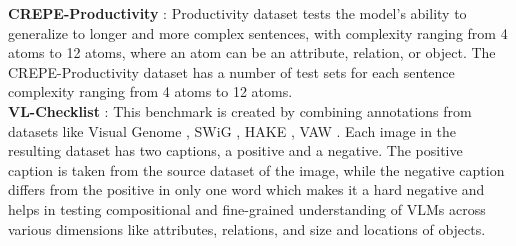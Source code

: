 \documentclass[11pt]{article}
\begin{document}
\begin{table}[h!]
\noindent \textbf{CREPE-Productivity} \cite{ma2022crepe}: Productivity dataset tests the model's ability to generalize to longer and more complex sentences, with complexity ranging from 4 atoms to 12 atoms, where an atom can be an attribute, relation, or object. The CREPE-Productivity dataset has a number of test sets for each sentence complexity ranging from 4 atoms to 12 atoms.\\
\noindent \textbf{VL-Checklist} \cite{zhao2022vlchecklist}: This benchmark is created by combining annotations from datasets like Visual Genome \citep{krishnavisualgenome}, SWiG \citep{swig}, HAKE \citep{hake}, VAW \citep{vaw}. Each image in the resulting dataset has two captions, a positive and a negative. The positive caption is taken from the source dataset of the image, while the negative caption differs from the positive in only one word which makes it a hard negative and helps in testing compositional and fine-grained understanding of VLMs across various dimensions like attributes, relations, and size and locations of objects.\\


\end{table}
\end{document}
